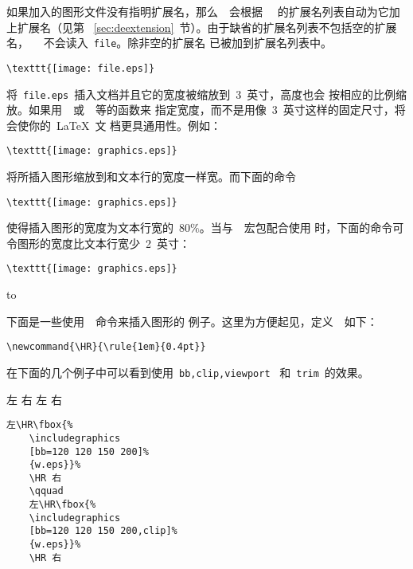 如果加入的图形文件没有指明扩展名，那么~~会根据
~~的扩展名列表自动为它加上扩展名（见第~
\ref{sec:deextension}~节）。由于缺省的扩展名列表不包括空的扩展名，
~~不会读入~\texttt{file}。除非空的扩展名
已被加到扩展名列表中。

 
\begin{Verbatim}[xleftmargin=1cm]
\texttt{[image: file.eps]}
\end{Verbatim}

将~\texttt{file.eps}~插入文档并且它的宽度被缩放到~3~英寸，高度也会
按相应的比例缩放。如果用~~或~~等的函数来
指定宽度，而不是用像~3~英寸这样的固定尺寸，将会使你的~\LaTeX{}~文
档更具通用性。例如：
\begin{Verbatim}[xleftmargin=1cm]
\texttt{[image: graphics.eps]}
\end{Verbatim}
将所插入图形缩放到和文本行的宽度一样宽。而下面的命令
\begin{Verbatim}[xleftmargin=1cm]
\texttt{[image: graphics.eps]}
\end{Verbatim}
使得插入图形的宽度为文本行宽的~$80\%$。当与~~宏包配合使用
时，下面的命令可令图形的宽度比文本行宽少~2~英寸：
\begin{Verbatim}[xleftmargin=1cm]
\texttt{[image: graphics.eps]}
\end{Verbatim}

\hbox to 

下面是一些使用~~命令来插入图形的
例子。这里为方便起见，定义~~如下：
\begin{Verbatim}[xleftmargin=1cm]
\newcommand{\HR}{\rule{1em}{0.4pt}}
\end{Verbatim}

\ifpdf\else %
\noindent 在下面的几个例子中可以看到使用~\texttt{bb,clip,viewport}~
和~\texttt{trim}~的效果。

\hspace{-1cm}\begin{minipage}[c]{.5\textwidth}
	左\HR%
	\HR 右
	\qquad
	左\HR%
	\HR 右
\end{minipage}%
\begin{minipage}[c]{.5\textwidth}
	\begin{Verbatim}[frame=lines,label=\colorbox{green}{\small 例一},labelposition=topline,]
	左\HR\fbox{%
	\includegraphics
	[bb=120 120 150 200]%
	{w.eps}}%
	\HR 右
	\qquad
	左\HR\fbox{%
	\includegraphics
	[bb=120 120 150 200,clip]%
	{w.eps}}%
	\HR 右
	\end{Verbatim}
\end{minipage}

